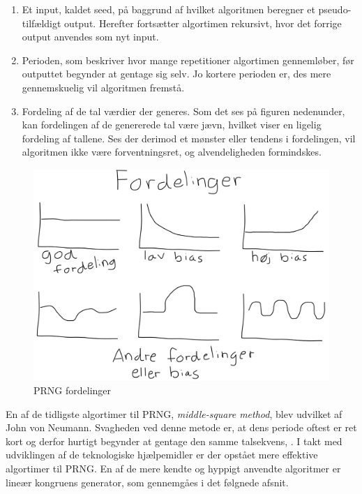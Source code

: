 \documentclass[
]{book}
\theoremstyle{definition}
\theoremstyle{definition}
\theoremstyle{definition}
\theoremstyle{remark}
\begin{document}
\begin{enumerate}
\def\labelenumi{\arabic{enumi}.}
\item
  Et input, kaldet seed, på baggrund af hvilket algoritmen beregner et pseudo-tilfældigt output. Herefter fortsætter algortimen rekursivt, hvor det forrige output anvendes som nyt input.
\item
  Perioden, som beskriver hvor mange repetitioner algortimen gennemløber, før outputtet begynder at gentage sig selv. Jo kortere perioden er, des mere gennemskuelig vil algoritmen fremstå.
\item
  Fordeling af de tal værdier der generes. Som det ses på figuren nedenunder, kan fordelingen af de genererede tal være jævn, hvilket viser en ligelig fordeling af tallene. Ses der derimod et mønster eller tendens i fordelingen, vil algoritmen ikke være forventningsret, og alvendeligheden formindskes.
\end{enumerate}

\begin{figure}

{\centering \includegraphics[width=0.75\linewidth]{images/prngfordelingerDK}

}

\caption{PRNG fordelinger}\label{fig:unnamed-chunk-1}
\end{figure}

En af de tidligste algortimer til PRNG, \emph{middle-square method}, blev udvilket af John von Neumann. Svagheden ved denne metode er, at dens periode oftest er ret kort og derfor hurtigt begynder at gentage den samme talsekvens, \citep[s. 12-13]{PRNGintro}. I takt med udviklingen af de teknologiske hjælpemidler er der opstået mere effektive algortimer til PRNG. En af de mere kendte og hyppigt anvendte algoritmer er lineær kongruens generator, som gennemgåes i det følgnede afsnit.
\end{document}

